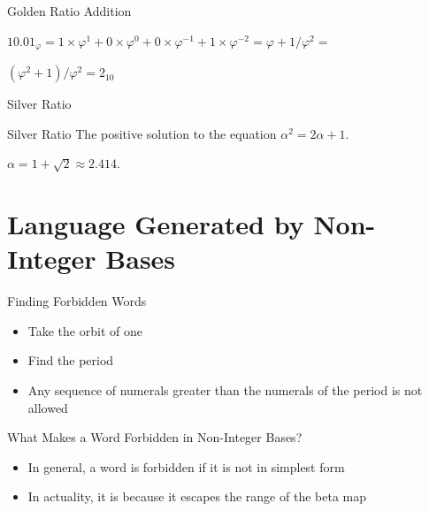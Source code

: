 \documentclass{beamer}
\begin{document}
          \begin{frame}{Golden Ratio Addition}
            \begin{example}
              $10.01_\varphi = 1\times\varphi^1+0\times\varphi^0+0\times\varphi^{-1}+1\times\varphi^{-2}=\varphi + 1/\varphi^2 =$

              $(\varphi^2 + 1)/\varphi^2 = 2_{10}$
            \end{example}
          \end{frame}


          \begin{frame}{Silver Ratio}
            \begin{block}{Silver Ratio}
              The positive solution to the equation $\alpha^2 = 2\alpha + 1$.

              $\alpha = 1+\sqrt{2} \approx 2.414$.
            \end{block}
          \end{frame}













          \section{Language Generated by Non-Integer Bases}
          \begin{frame}{Finding Forbidden Words}
            \begin{itemize}
              \item Take the orbit of one
              \item Find the period
              \item Any sequence of numerals greater than the numerals of the period is not allowed
            \end{itemize}
          \end{frame}

          \begin{frame}{What Makes a Word Forbidden in Non-Integer Bases?}
            \begin{itemize}
              \item In general, a word is forbidden if it is not in simplest form
              \item In actuality, it is because it escapes the range of the beta map
            \end{itemize}
          \end{frame}
\end{document}

